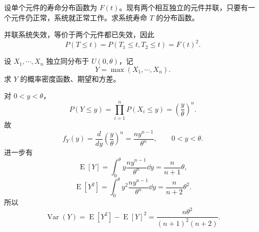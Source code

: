 \begin{question}
设单个元件的寿命分布函数为 $F(t)$。现有两个相互独立的元件并联，只要有一个元件仍正常，系统就正常工作。求系统寿命 $T$ 的分布函数。
\begin{solution}
并联系统失效，等价于两个元件都已失效，因此
\[
P(T\le t)=P(T_1\le t,T_2\le t)=F(t)^2.
\]
\end{solution}
\end{question}

\begin{question}
设 $X_1,\cdots,X_n$ 独立同分布于 $U(0,\theta)$，记
\[
Y=\max(X_1,\cdots,X_n).
\]
求 $Y$ 的概率密度函数、期望和方差。
\begin{solution}
对 $0<y<\theta$，
\[
P(Y\le y)=\prod_{i=1}^n P(X_i\le y)=\left(\frac{y}{\theta}\right)^n.
\]
故
\[
f_Y(y)=\frac{d}{dy}\left(\frac{y}{\theta}\right)^n
=\frac{n y^{n-1}}{\theta^n},\qquad 0<y<\theta.
\]
进一步有
\[
\operatorname{E}[Y]=\int_0^\theta y\frac{n y^{n-1}}{\theta^n}\dd{y}
=\frac{n}{n+1}\theta,
\]
\[
\operatorname{E}[Y^2]=\int_0^\theta y^2\frac{n y^{n-1}}{\theta^n}\dd{y}
=\frac{n}{n+2}\theta^2.
\]
所以
\[
\operatorname{Var}(Y)=\operatorname{E}[Y^2]-\operatorname{E}[Y]^2
=\frac{n\theta^2}{(n+1)^2(n+2)}.
\]
\end{solution}
\end{question}

